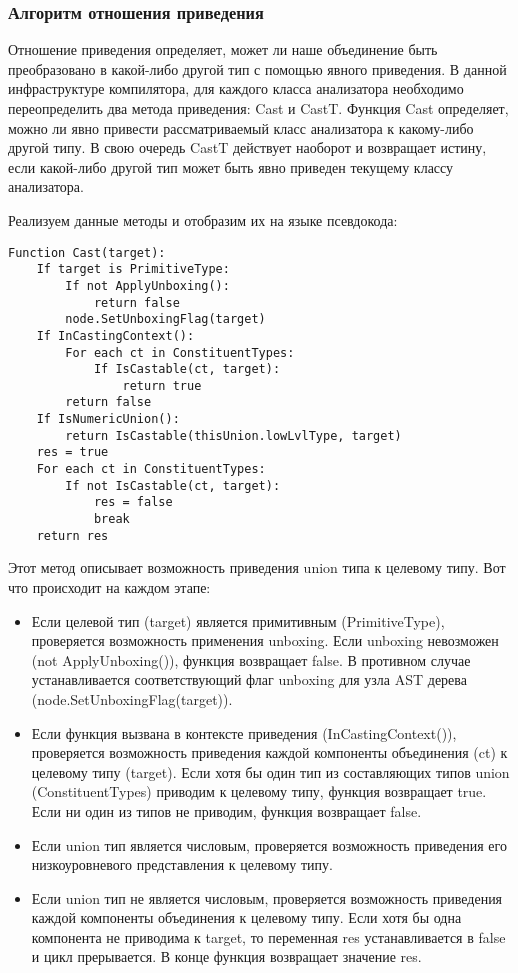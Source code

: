 \subsubsection{Алгоритм отношения приведения}

Отношение приведения определяет, может ли наше объединение быть преобразовано в какой-либо другой тип с помощью
явного приведения.
В данной инфраструктуре компилятора, для каждого класса анализатора необходимо переопределить два метода приведения:
Cast и CastT\@.
Функция Cast определяет, можно ли явно привести рассматриваемый класс анализатора к какому-либо другой типу.
В свою очередь CastT действует наоборот и возвращает истину, если какой-либо другой тип может быть явно приведен
текущему классу анализатора.

Реализуем данные методы и отобразим их на языке псевдокода:

\begin{lstlisting}[label={lst:casttarget}]
Function Cast(target):
    If target is PrimitiveType:
        If not ApplyUnboxing():
            return false
        node.SetUnboxingFlag(target)
    If InCastingContext():
        For each ct in ConstituentTypes:
            If IsCastable(ct, target):
                return true
        return false
    If IsNumericUnion():
        return IsCastable(thisUnion.lowLvlType, target)
    res = true
    For each ct in ConstituentTypes:
        If not IsCastable(ct, target):
            res = false
            break
    return res
\end{lstlisting}

Этот метод описывает возможность приведения union типа к целевому типу.
Вот что происходит на каждом этапе:

\begin{itemize}
    \item Если целевой тип (target) является примитивным (PrimitiveType), проверяется возможность применения unboxing.
    Если unboxing невозможен (not ApplyUnboxing()), функция возвращает false.
    В противном случае устанавливается соответствующий флаг unboxing для узла AST дерева (node.SetUnboxingFlag(target)).
    \item Если функция вызвана в контексте приведения (InCastingContext()), проверяется возможность приведения
    каждой компоненты объединения (ct) к целевому типу (target).
    Если хотя бы один тип из составляющих типов union (ConstituentTypes) приводим к целевому типу, функция возвращает true.
    Если ни один из типов не приводим, функция возвращает false.
    \item Если union тип является числовым, проверяется возможность приведения его низкоуровневого представления к
    целевому типу.
    \item Если union тип не является числовым, проверяется возможность приведения каждой компоненты объединения
    к целевому типу.
    Если хотя бы одна компонента не приводима к target, то переменная res устанавливается в false и цикл прерывается.
    В конце функция возвращает значение res.
\end{itemize}

